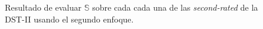 \begin{figure}
	\centering
	\caption{Resultado de evaluar $\mathbb{S}$ sobre cada cada una de las \textit{second-rated} de la DST-II usando el segundo enfoque.} \label{fig:gaussian-example-approach2}
\end{figure}

